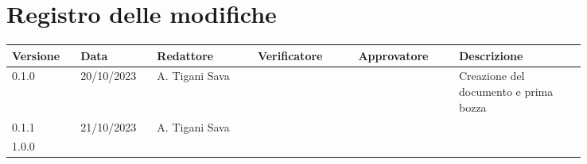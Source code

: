 \section{Registro delle modifiche}
{
\renewcommand{\arraystretch}{1.5}
\scriptsize
\begin{tabular}{p{0.10\linewidth}p{0.10\linewidth}p{0.15\linewidth}p{0.15\linewidth}p{0.15\linewidth}p{0.19\linewidth}}
    \textbf{Versione}   & \textbf{Data} & \textbf{Redattore}    & \textbf{Verificatore} & \textbf{Approvatore}  & \textbf{Descrizione}  \\
    \hline
    0.1.0               & 20/10/2023    & A. Tigani Sava        &                       &                       & Creazione del documento e prima bozza \\
    0.1.1               & 21/10/2023    & A. Tigani Sava        &						&                       &	\\
    1.0.0 \\
    \hline
\end{tabular}
}